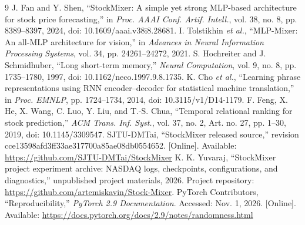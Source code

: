 \documentclass[conference]{IEEEtran}
\begin{document}
\begin{thebibliography}{9}
 J. Fan and Y. Shen, ``StockMixer: A simple yet strong MLP-based architecture for stock price forecasting,'' in \emph{Proc. AAAI Conf. Artif. Intell.}, vol. 38, no. 8, pp. 8389--8397, 2024, doi: 10.1609/aaai.v38i8.28681.
 I. Tolstikhin \emph{et al.}, ``MLP-Mixer: An all-MLP architecture for vision,'' in \emph{Advances in Neural Information Processing Systems}, vol. 34, pp. 24261--24272, 2021.
 S. Hochreiter and J. Schmidhuber, ``Long short-term memory,'' \emph{Neural Computation}, vol. 9, no. 8, pp. 1735--1780, 1997, doi: 10.1162/neco.1997.9.8.1735.
 K. Cho \emph{et al.}, ``Learning phrase representations using RNN encoder--decoder for statistical machine translation,'' in \emph{Proc. EMNLP}, pp. 1724--1734, 2014, doi: 10.3115/v1/D14-1179.
 F. Feng, X. He, X. Wang, C. Luo, Y. Liu, and T.-S. Chua, ``Temporal relational ranking for stock prediction,'' \emph{ACM Trans. Inf. Syst.}, vol. 37, no. 2, Art. no. 27, pp. 1--30, 2019, doi: 10.1145/3309547.
 SJTU-DMTai, ``StockMixer released source,'' revision cce13598afd3ff33ae317700a85ae08db0554652. [Online]. Available: \url{https://github.com/SJTU-DMTai/StockMixer}
 K. K. Yuvaraj, ``StockMixer project experiment archive: NASDAQ logs, checkpoints, configurations, and diagnostics,'' unpublished project materials, 2026. Project repository: \url{https://github.com/artemiskavin/Stock-Mixer}.
 PyTorch Contributors, ``Reproducibility,'' \emph{PyTorch 2.9 Documentation}. Accessed: Nov. 1, 2026. [Online]. Available: \url{https://docs.pytorch.org/docs/2.9/notes/randomness.html}
\end{thebibliography}
\end{document}
